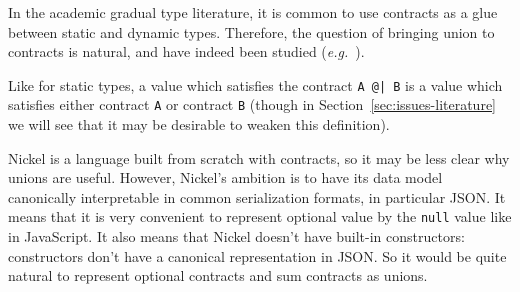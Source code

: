 \documentclass[sigplan,10pt,review,anonymous]{acmart}
\newcommand{\nickel}[1]{\lstinline[language=nickel]{#1}}
\begin{document}
In the academic gradual type literature, it is common to use contracts
as a glue between static and dynamic types. Therefore, the question of
bringing union to contracts is natural, and have indeed been studied
(\emph{e.g.}~\cite{KeilThiemannUnionIntersection,RootCauseOfBlame}).

Like for static types, a value which satisfies the contract \nickel{A @| B}
is a value which satisfies either contract \nickel{A} or
contract \nickel{B} (though in Section~\ref{sec:issues-literature} we
will see that it may be desirable to weaken this definition).

Nickel is a language built from scratch with contracts, so it may be
less clear why unions are useful. However, Nickel's ambition is to
have its data model canonically interpretable in common serialization
formats, in particular JSON. It means that it is very convenient to
represent optional value by the \nickel{null} value like in
JavaScript. It also means that Nickel doesn't have built-in
constructors: constructors don't have a canonical representation in
JSON. So it would be quite natural to represent optional contracts and
sum contracts as unions.

%



\end{document}
